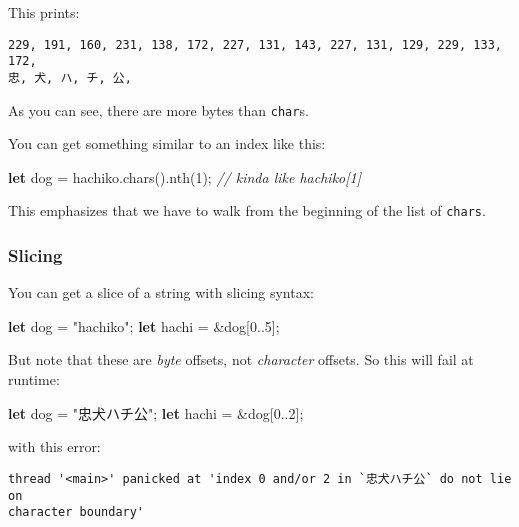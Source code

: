 \documentclass[a4paper,]{book}
\newenvironment{Shaded}{\begin{snugshade}}{\end{snugshade}}
\newcommand{\KeywordTok}[1]{\textcolor[rgb]{0.13,0.29,0.53}{\textbf{{#1}}}}
\newcommand{\DecValTok}[1]{\textcolor[rgb]{0.00,0.00,0.81}{{#1}}}
\newcommand{\StringTok}[1]{\textcolor[rgb]{0.31,0.60,0.02}{{#1}}}
\newcommand{\CommentTok}[1]{\textcolor[rgb]{0.56,0.35,0.01}{\textit{{#1}}}}
\newcommand{\NormalTok}[1]{{#1}}
\begin{document}
This prints:

\begin{verbatim}
229, 191, 160, 231, 138, 172, 227, 131, 143, 227, 131, 129, 229, 133, 172,
忠, 犬, ハ, チ, 公,
\end{verbatim}

As you can see, there are more bytes than \texttt{char}s.

You can get something similar to an index like this:

\begin{Shaded}
\begin{Highlighting}[]
\KeywordTok{let} \NormalTok{dog = hachiko.chars().nth(}\DecValTok{1}\NormalTok{); }\CommentTok{// kinda like hachiko[1]}
\end{Highlighting}
\end{Shaded}

This emphasizes that we have to walk from the beginning of the list of
\texttt{chars}.

\subsubsection{Slicing}\label{slicing}

You can get a slice of a string with slicing syntax:

\begin{Shaded}
\begin{Highlighting}[]
\KeywordTok{let} \NormalTok{dog = }\StringTok{"hachiko"}\NormalTok{;}
\KeywordTok{let} \NormalTok{hachi = &dog[}\DecValTok{0.}\NormalTok{.}\DecValTok{5}\NormalTok{];}
\end{Highlighting}
\end{Shaded}

But note that these are \emph{byte} offsets, not \emph{character}
offsets. So this will fail at runtime:

\begin{Shaded}
\begin{Highlighting}[]
\KeywordTok{let} \NormalTok{dog = }\StringTok{"忠犬ハチ公"}\NormalTok{;}
\KeywordTok{let} \NormalTok{hachi = &dog[}\DecValTok{0.}\NormalTok{.}\DecValTok{2}\NormalTok{];}
\end{Highlighting}
\end{Shaded}

with this error:

\begin{verbatim}
thread '<main>' panicked at 'index 0 and/or 2 in `忠犬ハチ公` do not lie on
character boundary'
\end{verbatim}
\end{document}
